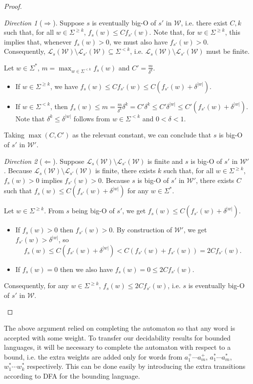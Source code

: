 \documentclass{lmcs}
\theoremstyle{plain}
\theoremstyle{definition}
\theoremstyle{remark}
\newtheorem{dir}{Direction}
\newcommand\lng[2]{\mathcal{L}_{#1}(#2)}
\newcommand\wa{\mathcal{W}}
\renewcommand\nu{f}
\begin{document}
\begin{proof}\hfill
\begin{dir}[$\Rightarrow$] Suppose $s$ is eventually big-O of $s'$ in $\wa$, i.e. there exist $C,k$ such that, for all $w\in \Sigma^{\ge k}$, $\nu_s(w)\le C \nu_{s'}(w)$.
Note that, for $w\in\Sigma^{\ge k}$, this implies that, whenever $\nu_s(w)>0$, we must also have $\nu_{s'}(w)>0$. Consequently, $\lng{s}{\wa}\setminus\lng{s'}{\wa}\subseteq \Sigma^{<k}$, i.e.
 $\lng{s}{\wa}\setminus\lng{s'}{\wa}$ must be finite.

 Let $w\in\Sigma^\ast$, $m= \max_{w\in \Sigma^{<k}} \nu_s (w)$ and $C'=\frac{m}{\delta^k}$.
 \begin{itemize}
 \item If $w\in \Sigma^{\ge k}$, we have $\nu_s(w)\le C \nu_{s'}(w) \le C(\nu_{s'}(w) + \delta^{|w|})$.
 \item If $w\in \Sigma^{<k}$, then $\nu_s(w)\le m = \frac{m}{\delta^k} \delta^k =C' \delta^k \le C'\delta^{|w|} \le C'(\nu_{s'}(w)+\delta^{|w|})$.
 Note that $\delta^k \le \delta^{|w|}$ follows from $w\in\Sigma^{<k}$ and $0<\delta<1$.
 \end{itemize}

 Taking  $\max(C,C')$ as the relevant constant, we can conclude that $s$ is big-O of $s'$ in $\wa'$.
 \end{dir}
 \begin{dir}[$\Leftarrow$]
Suppose $\lng{s}{\wa}\setminus\lng{s'}{\wa}$ is finite and $s$ is big-O of $s'$ in $\wa'$.
Because $\lng{s}{\wa}\setminus\lng{s'}{\wa}$ is finite, there exists $k$ such that, for all $w\in\Sigma^{\ge k}$, $\nu_s(w)>0$ implies $\nu_{s'}(w)>0$.
Because $s$ is big-O of $s'$ in $\wa'$, there exists $C$ such that $\nu_s(w)\le C(\nu_{s'}(w)+\delta^{|w|})$ for any $w\in\Sigma^\ast$.

Let $w\in\Sigma^{\ge k}$.
From $s$ being big-O of $s'$, we get $\nu_s(w)\le C (\nu_{s'}(w)+\delta^{|w|})$.
\begin{itemize}
\item If $\nu_s(w) > 0$ then $\nu_{s'}(w)>0$. By construction of $\wa'$, we get $\nu_{s'}(w)> \delta^{|w|}$, so
\[
\nu_s(w)\le C(\nu_{s'}(w) + \delta^{|w|}) < C(\nu_{s'}(w)+\nu_{s'}(w)) = 2C \nu_{s'}(w).
\]
\item If $\nu_s(w)=0$ then we also have $\nu_s(w) = 0 \le 2C \nu_{s'}(w)$.
\end{itemize}
Consequently, for any $w\in\Sigma^{\ge k}$, $\nu_s(w)\le 2C \nu_{s'}(w)$, i.e. $s$ is eventually big-O of $s'$ in $\wa$.\qedhere
\end{dir}
\end{proof}
The above argument relied on completing the automaton so that any word is accepted with some weight.
To transfer our decidability results for bounded languages, it will be necessary to complete the automaton with respect to a bound, i.e. the extra weights are added only for words from
$a_1^+\cdots a_m^+$, $a_1^\ast\cdots a_m^\ast$, $w_1^\ast\cdots w_k^\ast$ respectively.
This can be done easily by introducing the extra transitions according to DFA for the bounding language.
\end{document}

